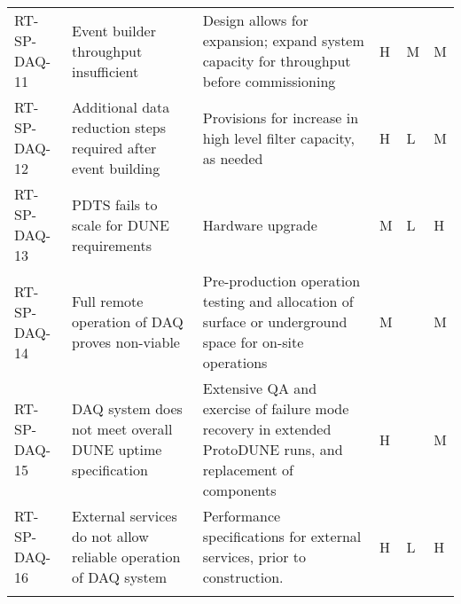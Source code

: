 \begin{longtable}{p{}p{}p{}p{}p{}p{}}
RT-SP-DAQ-11 & Event builder throughput insufficient & Design allows for expansion; expand system capacity for throughput before commissioning & H  & M & M \\  \colhline
RT-SP-DAQ-12 & Additional data reduction steps required after event building & Provisions for increase in high level filter capacity, as needed & H  & L & M \\  \colhline
RT-SP-DAQ-13 & PDTS fails to scale for DUNE requirements & Hardware upgrade & M & L & H  \\  \colhline
RT-SP-DAQ-14 & Full remote operation of DAQ proves non-viable & Pre-production operation testing and allocation of surface or underground space for on-site operations & M &  & M \\  \colhline
RT-SP-DAQ-15 & DAQ system does not meet overall DUNE uptime specification & Extensive QA and exercise of failure mode recovery in extended ProtoDUNE runs, and replacement of components & H  &  & M \\  \colhline
RT-SP-DAQ-16 & External services do not allow reliable operation of DAQ system & Performance specifications for external services, prior to construction. & H  & L & H  \\  \colhline

\label{tab:risks:SP-FD-DAQ}
\end{longtable}